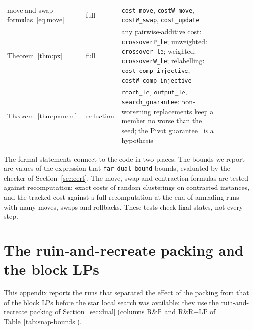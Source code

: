 \begin{table}[!tbp]
\begin{tabular}{p{0.30\linewidth}p{0.12\linewidth}p{0.46\linewidth}}
move and swap formulas~\eqref{eq:move} & full & \texttt{cost\_move}, \texttt{costW\_move}, \texttt{costW\_swap}, \texttt{cost\_update} \\
Theorem~\ref{thm:px} & full & any pairwise-additive cost: \texttt{crossoverP\_le}; unweighted: \texttt{crossover\_le}; weighted: \texttt{crossoverW\_le}; relabelling: \texttt{cost\_comp\_injective}, \texttt{costW\_comp\_injective} \\
Theorem~\ref{thm:pxmem} & reduction & \texttt{reach\_le}, \texttt{output\_le}, \texttt{search\_guarantee}: non-worsening replacements keep a member no worse than the seed; the Pivot guarantee~\citep{AilonCN08} is a hypothesis \\
\bottomrule
\end{tabular}
\end{table}

The formal statements connect to the code in two places.  The bounds we
report are values of the expression that \texttt{far\_dual\_bound} bounds,
evaluated by the checker of Section~\ref{sec:cert}.  The move, swap and
contraction formulas are tested against recomputation: exact costs of random
clusterings on contracted instances, and the tracked cost against a full
recomputation at the end of annealing runs with many moves, swaps and
rollbacks.  These tests check final states, not every step.

\section{The ruin-and-recreate packing and the block LPs}\label{app:eqtime}

This appendix reports the runs that separated the effect of the packing from that of the block LPs before the star local search was available; they use the ruin-and-recreate packing of Section~\ref{sec:dual} (columns R\&R and R\&R+LP of Table~\ref{tab:snap-bounds}).

